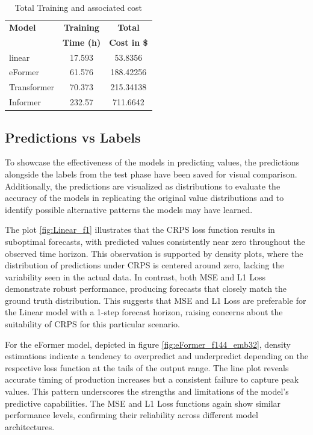 \documentclass{article}
\begin{document}
\begin{table}
    \footnotesize
    \centering
    \caption{Total Training and associated cost}
    \begin{tabular}{l|S|S}
        \toprule
        \textbf{Model} & \textbf{Training} & \textbf{Total} \\
         & \textbf{Time (h)} & \textbf{Cost in \$} \\
        \midrule
        linear & 17.593 & 53.8356 \\
        eFormer & 61.576 & 188.42256 \\
        Transformer & 70.373 & 215.34138 \\
        Informer & 232.57 & 711.6642 \\
    \bottomrule
    \end{tabular}
    \label{tab:total_training_cost}
\end{table}

\subsection{Predictions vs Labels}

To showcase the effectiveness of the models in predicting values, the predictions alongside the labels from the test phase have been saved for visual comparison. Additionally, the predictions are visualized as distributions to evaluate the accuracy of the models in replicating the original value distributions and to identify possible alternative patterns the models may have learned.

The plot \ref{fig:Linear_f1} illustrates that the CRPS loss function results in suboptimal forecasts, with predicted values consistently near zero throughout the observed time horizon. This observation is supported by density plots, where the distribution of predictions under CRPS is centered around zero, lacking the variability seen in the actual data. In contrast, both MSE and L1 Loss demonstrate robust performance, producing forecasts that closely match the ground truth distribution. This suggests that MSE and L1 Loss are preferable for the Linear model with a 1-step forecast horizon, raising concerns about the suitability of CRPS for this particular scenario.

For the eFormer model, depicted in figure \ref{fig:eFormer_f144_emb32}, density estimations indicate a tendency to overpredict and underpredict depending on the respective loss function at the tails of the output range. The line plot reveals accurate timing of production increases but a consistent failure to capture peak values. This pattern underscores the strengths and limitations of the model's predictive capabilities. The MSE and L1 Loss functions again show similar performance levels, confirming their reliability across different model architectures.
\end{document}
